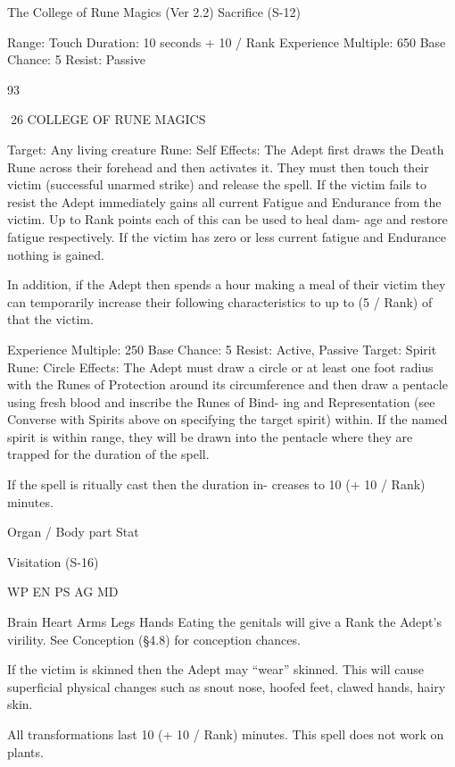 \begin{Chapter}{The College of Rune Magics (Ver 2.2)}
Sacrifice (S-12) 

Range: Touch 
Duration: 10 seconds + 10 / Rank 
Experience Multiple: 650 
Base Chance: 5%
Resist: Passive 

93 

26 COLLEGE OF RUNE MAGICS 

Target: Any living creature 
Rune: Self 
Effects:  The  Adept  first  draws  the  Death  Rune 
across  their  forehead  and  then  activates  it.  They 
must  then  touch  their  victim  (successful  unarmed 
strike)  and  release  the  spell.  If  the  victim  fails  to 
resist  the  Adept  immediately  gains  all  current 
Fatigue  and  Endurance  from  the  victim.  Up  to 
Rank points each of this can be used to heal dam-
age  and  restore  fatigue  respectively.  If  the  victim 
has  zero  or  less  current  fatigue  and  Endurance 
nothing is gained. 

In addition, if the Adept then spends a hour making 
a meal of their victim they can temporarily increase 
their following characteristics to up to (5 / Rank) %
of that the victim. 

Experience Multiple: 250 
Base Chance: 5%
Resist: Active, Passive 
Target: Spirit 
Rune: Circle 
Effects:  The  Adept  must  draw  a  circle  or  at  least 
one  foot  radius  with  the  Runes  of  Protection 
around its circumference and then draw a pentacle 
using  fresh  blood  and  inscribe  the  Runes  of  Bind-
ing  and  Representation  (see  Converse  with  Spirits 
above on specifying the target spirit) within. If the 
named  spirit  is  within  range,  they  will  be  drawn 
into  the  pentacle  where  they  are  trapped  for  the 
duration of the spell. 

If  the  spell  is  ritually  cast  then  the  duration  in-
creases to 10 (+ 10 / Rank) minutes. 

Organ / Body part  Stat  

Visitation (S-16) 

WP  
EN  
PS  
AG  
MD 

Brain 
Heart 
Arms 
Legs 
Hands 
Eating  the  genitals  will  give  a  Rank%
the  Adept’s  virility.  See  Conception  (§4.8)  for 
conception chances. 

If the victim is skinned then the Adept may “wear” 
skinned.  This  will  cause  superficial  physical 
changes  such  as  snout  nose,  hoofed  feet,  clawed 
hands, hairy skin. 

All transformations last 10 (+  10 / Rank) minutes. 
This spell does not work on plants. 


\end{Chapter}
